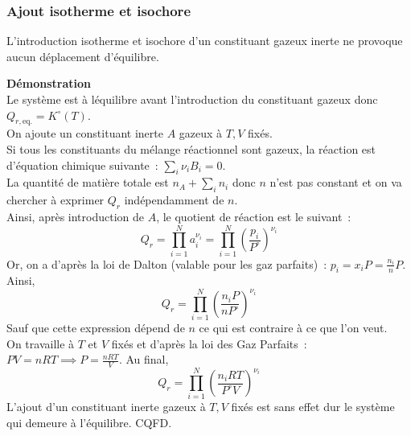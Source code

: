 \documentclass{article}
\newcommand{\equi}{\text{eq.}}
\begin{document}
\subsubsection{Ajout isotherme et isochore}
\begin{enonce}
    L’introduction isotherme et isochore d’un constituant gazeux inerte ne provoque aucun déplacement d’équilibre.
\end{enonce}
\begin{tableau}
    \textbf{Démonstration}\\
    Le système est à léquilibre avant l'introduction du constituant gazeux donc $Q_{r,\equi} = K^\circ(T)$.\\
    
    On ajoute un constituant inerte $A$ gazeux à $T,V$ fixés.\\
    
    Si tous les constituants du mélange réactionnel sont gazeux, la réaction est d'équation chimique suivante~: $\sum_i \nu_i B_i = 0$.\\
    
    La quantité de matière totale est $n_A + \sum_i n_i$ donc $n$ n'est pas constant et on va chercher à exprimer $Q_r$ indépendamment de $n$.\\
    Ainsi, après introduction de $A$, le quotient de réaction est le suivant~:
    $$Q_r = \prod_{i=1}^N a_i^{\nu_i} = \prod_{i=1}^N \left(\frac{p_i}{P^\circ}\right)^{\nu_i}$$
    Or, on a d'après la loi de Dalton (valable pour les gaz parfaits)~: $p_i = x_iP = \frac{n_i}{n}P$. Ainsi,
    $$Q_r = \prod_{i=1}^N \left(\frac{n_iP}{nP^\circ}\right)^{\nu_i}$$
    Sauf que cette expression dépend de $n$ ce qui est contraire à ce que l'on veut.\\
    On travaille à $T$ et $V$ fixés et d'après la loi des Gaz Parfaits~: $PV=nRT \implies P=\frac{nRT}{V}$. Au final,
    $$Q_r = \prod_{i=1}^N \left(\frac{n_iRT}{P^\circ V}\right)^{\nu_i}$$
    L'ajout d'un constituant inerte gazeux à $T,V$ fixés est sans effet dur le système qui demeure à l'équilibre. CQFD.
    \end{tableau}
\end{document}
